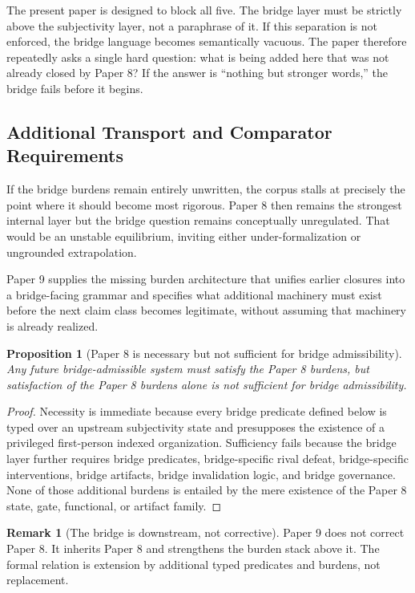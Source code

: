 \documentclass[11pt,a4paper]{article}
\newtheorem{proposition}[theorem]{Proposition}
\theoremstyle{definition}
\newtheorem{remark}[theorem]{Remark}
\begin{document}
The present paper is designed to block all five. The bridge layer must be strictly above the subjectivity layer, not a paraphrase of it. If this separation is not enforced, the bridge language becomes semantically vacuous. The paper therefore repeatedly asks a single hard question: what is being added here that was not already closed by Paper 8? If the answer is ``nothing but stronger words,'' the bridge fails before it begins.

\subsection{Additional Transport and Comparator Requirements}
If the bridge burdens remain entirely unwritten, the corpus stalls at precisely the point where it should become most rigorous. Paper 8 then remains the strongest internal layer but the bridge question remains conceptually unregulated. That would be an unstable equilibrium, inviting either under-formalization or ungrounded extrapolation.

Paper 9 supplies the missing burden architecture that unifies earlier closures into a bridge-facing grammar and specifies what additional machinery must exist before the next claim class becomes legitimate, without assuming that machinery is already realized.

\begin{proposition}[Paper 8 is necessary but not sufficient for bridge admissibility]
Any future bridge-admissible system must satisfy the Paper 8 burdens, but satisfaction of the Paper 8 burdens alone is not sufficient for bridge admissibility.
\end{proposition}

\begin{proof}
Necessity is immediate because every bridge predicate defined below is typed over an upstream subjectivity state and presupposes the existence of a privileged first-person indexed organization. Sufficiency fails because the bridge layer further requires bridge predicates, bridge-specific rival defeat, bridge-specific interventions, bridge artifacts, bridge invalidation logic, and bridge governance. None of those additional burdens is entailed by the mere existence of the Paper 8 state, gate, functional, or artifact family.
\end{proof}

\begin{remark}[The bridge is downstream, not corrective]
Paper 9 does not correct Paper 8. It inherits Paper 8 and strengthens the burden stack above it. The formal relation is extension by additional typed predicates and burdens, not replacement.
\end{remark}
\end{document}
